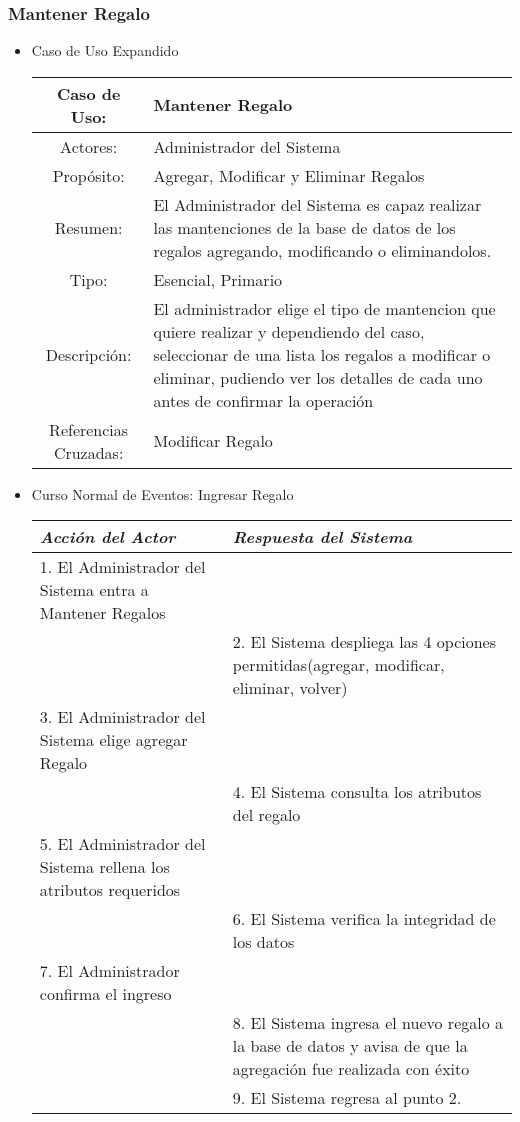 \subsubsection{Mantener Regalo}
\begin{itemize}
	\item Caso de Uso Expandido\\
		\begin{tabular}{|c|p{9.5cm}|}\hline
			Caso de Uso: & Mantener Regalo  \\\hline
			Actores: & Administrador del Sistema \\\hline
			Propósito: & Agregar, Modificar y Eliminar Regalos \\\hline
			Resumen: & El Administrador del Sistema es capaz realizar las mantenciones de la base de datos de los regalos agregando, modificando o eliminandolos.\\\hline
			Tipo: & Esencial, Primario \\\hline
			Descripción: & El administrador elige el tipo de mantencion que quiere realizar y dependiendo del caso, seleccionar de una lista los regalos a modificar o eliminar, pudiendo ver los detalles de cada uno antes de confirmar la operaci\'on  \\\hline
			Referencias Cruzadas: & Modificar Regalo \\\hline
		\end{tabular}

	\item Curso Normal de Eventos: Ingresar Regalo\\
		\begin{tabular}{|p{6.6cm}|p{6.6cm}|}\hline
			\emph{Acción del Actor} & \emph{Respuesta del Sistema}\\\hline
			1. El Administrador del Sistema entra a Mantener Regalos&\\\hline
			&2. El Sistema despliega las 4 opciones permitidas(agregar, modificar, eliminar, volver)\\\hline
			3. El Administrador del Sistema elige agregar Regalo&\\\hline
			&4. El Sistema consulta los atributos del regalo\\\hline
			5. El Administrador del Sistema rellena los atributos requeridos&\\\hline
			&6. El Sistema verifica la integridad de los datos\\\hline
			7. El Administrador confirma el ingreso&\\\hline
			&8. El Sistema ingresa el nuevo regalo a la base de datos y avisa de que la agregaci\'on fue realizada con \'exito\\\hline
			&9. El Sistema regresa al punto 2. \\\hline
		\end{tabular}


\end{itemize}
